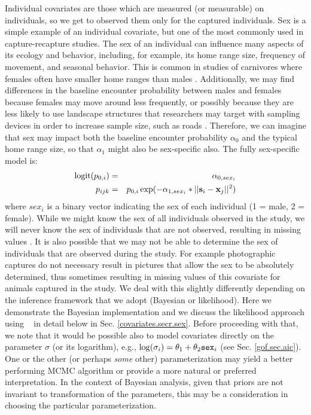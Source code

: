 Individual covariates are those which are measured (or measurable) on
individuals, so we get to observed them only for the captured
individuals. Sex is a simple example of an individual covariate, but
one of the most commonly used in capture-recapture studies. 
The sex of an individual can influence many aspects of its ecology and
behavior, including, for example, its home range size, frequency of
movement, and seasonal behavior. This is common in studies of
carnivores where females often have smaller home ranges than males
\citep{gardner_etal:2010jwm, sollmann_etal:2011}. Additionally, we may
find differences in the baseline encounter probability
 between males and females
because females may move around less frequently, or possibly because
they are less likely to use landscape structures that researchers may
target with sampling devices in order to increase sample size, such as
roads \citep[e.g.][]{salom-perez_etal:2007}.
Therefore, 
we can imagine that sex may impact both the baseline encounter
probability $\alpha_{0}$ and the typical home range
size, so that
$\alpha_{1}$ might also be sex-specific also.  The fully sex-specific model is:
\begin{eqnarray*}
\mbox{logit}(p_{0,i}) &= &\alpha_{0,sex_{i}}  \\
p_{ijk} &= &p_{0,i} \exp(- \alpha_{1, sex_{i}}*||{\bf s}_{i}-{\bf x}_{j}||^2)
\end{eqnarray*}
where $sex_{i}$ is a binary vector indicating the sex of
each individual (1 = male, 2 = female).  While we might know the sex of all
individuals observed in the study, we will never know the
sex of individuals that are not observed,
resulting in missing values \citep{gardner_etal:2010jwm}.
It is also possible that we may not be able to determine the sex of
individuals that are observed during the study. For example photographic
captures do not necessary result in pictures that allow the sex to be absolutely
determined, thus sometimes resulting in missing values of this covariate for animals
captured in the study.   We deal with this slightly differently
depending on the inference framework 
that we adopt (Bayesian or likelihood).  Here we demonstrate the Bayesian implementation 
and we discuss the likelihood approach using \secr~ in detail
below in Sec. \ref{covariates.secr.sex}.
Before proceeding with that, we note that it would be possible also to
model covariates directly on the parameter $\sigma$ (or its
logarithm), e.g., $\log(\sigma_{i}) = \theta_{1} + \theta_{2}
\mbox{\tt sex}_{i}$ (see Sec. \ref{gof.sec.aic}). 
One or the other (or perhaps {\it some} other)
parameterization may yield a better performing MCMC algorithm or provide a
more natural or preferred interpretation.
In the context of Bayesian analysis, given that priors are not
invariant to transformation of the parameters, this may be a
consideration in choosing the particular parameterization.


